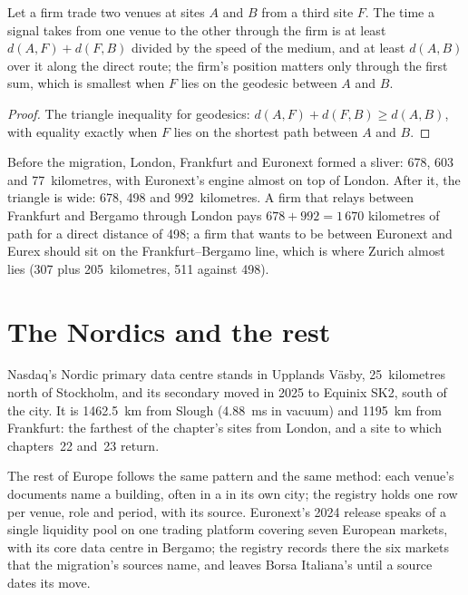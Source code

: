 \label{lst:nw:the-european-map:move}

\begin{proposition}\label{prop:nw:the-european-map:triangle}
Let a firm trade two venues at sites $A$ and $B$ from a third site $F$. The time a signal takes from one venue to the other through the
firm is at least $d(A,F) + d(F,B)$ divided by the speed of the medium, and at least $d(A,B)$ over it along the direct route; the firm's
position matters only through the first sum, which is smallest when $F$ lies on the geodesic between $A$ and $B$.
\end{proposition}

\begin{proof}
The triangle inequality for geodesics: $d(A,F) + d(F,B) \ge d(A,B)$, with equality exactly when $F$ lies on the shortest path between $A$ and
$B$.
\end{proof}

Before the migration, London, Frankfurt and Euronext formed a sliver: 678, 603 and 77~kilometres, with Euronext's engine almost on top of
London. After it, the triangle is wide: 678, 498 and 992~kilometres. A firm that relays between Frankfurt and Bergamo through London pays
$678 + 992 = 1\,670$ kilometres of path for a direct distance of 498; a firm that wants to be between Euronext and Eurex should sit on the
Frankfurt--Bergamo line, which is where Zurich almost lies (307 plus 205~kilometres, 511 against 498).

\section{The Nordics and the rest}

Nasdaq's Nordic primary data centre stands in Upplands Väsby, 25~kilometres north of Stockholm, and its secondary moved in 2025 to Equinix
SK2, south of the city. It is \qty{1462.5}{\kilo\metre} from Slough (\qty{4.88}{\milli\second} in vacuum) and \qty{1195}{\kilo\metre} from
Frankfurt: the farthest of the chapter's sites from London, and a site to which chapters~22 and~23 return.

The rest of Europe follows the same pattern and the same method: each venue's documents name a building, often in a  in its own city; the registry holds one row per venue, role and period, with its source. Euronext's 2024 release speaks of a single
liquidity pool on one trading platform covering seven European markets, with its core data centre in Bergamo; the registry records there
the six markets that the migration's sources name, and leaves Borsa Italiana's until a source dates its move.

